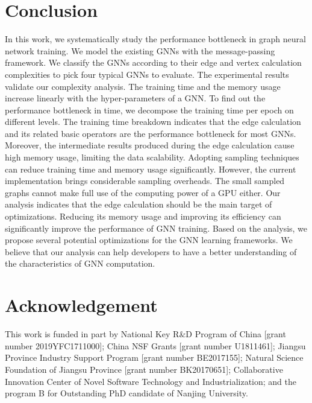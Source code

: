 \section{Conclusion}
\label{sec:conclusion}

In this work, we systematically study the performance bottleneck in graph neural network training.
We model the existing GNNs with the message-passing framework.
We classify the GNNs according to their edge and vertex calculation complexities to pick four typical GNNs to evaluate.
The experimental results validate our complexity analysis.
The training time and the memory usage increase linearly with the hyper-parameters of a GNN.
To find out the performance bottleneck in time, we decompose the training time per epoch on different levels.
The training time breakdown indicates that the edge calculation and its related basic operators are the performance bottleneck for most GNNs.
Moreover, the intermediate results produced during the edge calculation cause high memory usage, limiting the data scalability.
Adopting sampling techniques can reduce training time and memory usage significantly.
However, the current implementation brings considerable sampling overheads.
The small sampled graphs cannot make full use of the computing power of a GPU either.
Our analysis indicates that the edge calculation should be the main target of optimizations.
Reducing its memory usage and improving its efficiency can significantly improve the performance of GNN training.
Based on the analysis, we propose several potential optimizations for the GNN learning frameworks.
We believe that our analysis can help developers to have a better understanding of the characteristics of GNN computation.

\section*{Acknowledgement}

This work is funded in part by National Key R\&D Program of China [grant number 2019YFC1711000]; China NSF Grants [grant number U1811461]; Jiangsu Province Industry Support Program [grant number BE2017155]; Natural Science Foundation of Jiangsu Province [grant number BK20170651]; Collaborative Innovation Center of Novel Software Technology and Industrialization; and the program B for Outstanding PhD candidate of Nanjing University.
